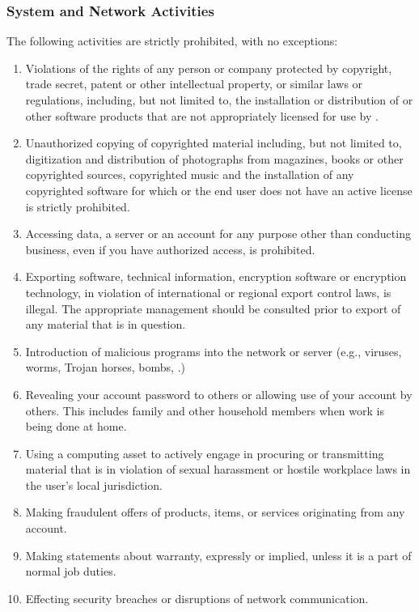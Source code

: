 \subsubsection{System and Network Activities}
The following activities are strictly prohibited, with no exceptions:
\begin{enumerate}
\item
Violations of the rights of any person or company protected by copyright, trade secret, patent or other intellectual property, or similar laws or regulations, including, but not limited to, the installation or distribution of  or other software products that are not appropriately licensed for use by \CompanyName{}.
\item
Unauthorized copying of copyrighted material including, but not limited to, digitization and distribution of photographs from magazines, books or other copyrighted sources, copyrighted music\oxford{} and the installation of any copyrighted software for which \CompanyName{} or the end user does not have an active license is strictly prohibited.
\item
Accessing data, a server or an account for any purpose other than conducting \CompanyName{} business, even if you have authorized access, is prohibited.
\item
Exporting software, technical information, encryption software\oxford{} or encryption technology, in violation of international or regional export control laws, is illegal.  
The appropriate management should be consulted prior to export of any material that is in question.
\item
Introduction of malicious programs into the network or server (e.g., viruses, worms, Trojan horses, \email{} bombs, \etc{}.)
\item
Revealing your account password to others or allowing use of your account by others.  
This includes family and other household members when work is being done at home.
\item
Using a \CompanyName{} computing asset to actively engage in procuring or transmitting material that is in violation of sexual harassment or hostile workplace laws in the user's local jurisdiction.
\item
Making fraudulent offers of products, items, or services originating from any \CompanyName{} account.
\item
Making statements about warranty, expressly or implied, unless it is a part of normal job duties.
\item
Effecting security breaches or disruptions of network communication.  

\end{enumerate}
